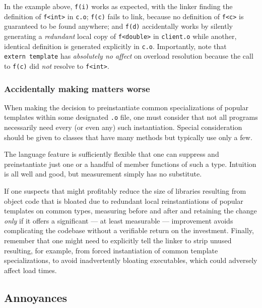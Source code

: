 \noindent In the example above, \lstinline!f(i)! works as expected, with the linker
finding the definition of \lstinline!f<int>! in \lstinline!c.o!; \lstinline!f(c)!
fails to link, because no definition of \lstinline!f<c>! is guaranteed to
be found anywhere; and \lstinline!f(d)! accidentally works by silently
generating a \emph{redundant} local copy of \lstinline!f<double>! in
\lstinline!client.o! while another, identical definition is generated
explicitly in \lstinline!c.o!. Importantly, note that
\lstinline!extern!~\lstinline!template! has \emph{absolutely no affect} on
overload resolution because the call to \lstinline!f(c)! did \emph{not}
resolve to \lstinline!f<int>!.

\subsubsection[Accidentally making matters worse]{Accidentally making matters worse}\label{accidentally-making-matters-worse}

When making the decision to preinstantiate common specializations of
popular templates within some designated \lstinline!.o! file, one must
consider that not all programs necessarily need every (or even any) such
instantiation. Special consideration should be given to classes that
have many methods but typically use only a few.

The language feature is sufficiently flexible that one can suppress and
preinstantiate just one or a handful of member functions of such a type. Intuition is all well and good, but measurement simply has no
substitute.

If one suspects that 
might profitably reduce the size of libraries resulting from object code
that is bloated due to redundant local reinstantiations of popular
templates on common types, measuring before and after and retaining the
change \emph{only} if it offers a significant --- at least measurable
--- improvement avoids complicating the codebase without a verifiable
return on the investment. Finally, remember that one might need to
explicitly tell the linker to strip unused  resulting,
for example, from forced instantiation of common template
specializations, to avoid inadvertently bloating executables, which
could adversely affect load times.

\subsection[Annoyances]{Annoyances}\label{annoyances-externtemplate}

